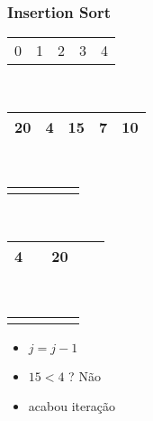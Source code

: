 \documentclass{beamer}
\begin{document}
\begin{frame}
    \frametitle{Insertion Sort}
    \begin{center}
        \begin{table}
            \begin{tabular}{p{0.25cm} p{0.25cm} p{0.25cm} p{0.25cm} p{0.25cm}}
                0 & 1 & 2 & 3 & 4
            \end{tabular} \\
            \begin{tabular}{| p{0.25cm} | p{0.25cm} | p{0.25cm} | p{0.25cm} | p{0.25cm} |}
                \hline
                20 & 4 & 15 & 7 & 10 \\ \hline
            \end{tabular} \\
            \begin{tabular}{p{0.25cm} p{0.25cm} p{0.25cm} p{0.25cm} p{0.25cm}}
                & & \color{green}{$\uparrow$} & &
            \end{tabular} \\
            \begin{tabular}{| p{0.25cm} | p{0.25cm} | p{0.25cm} | p{0.25cm} | p{0.25cm} |}
                \hline
                4 &  & 20 & & \\ \hline
            \end{tabular} \\
            \begin{tabular}{p{0.25cm} p{0.25cm} p{0.25cm} p{0.25cm} p{0.25cm}}
                \color{red}{$\uparrow$} & \color{blue}{$\uparrow$} & & &
            \end{tabular}
        \end{table}
	\end{center}
    \color{green}{$ordenando = 15$}
    \begin{itemize}[<+->]
        \item $j = j - 1$
        \item $15 < 4$ ? Não
        \item acabou iteração
    \end{itemize}
\end{frame}
\end{document}
